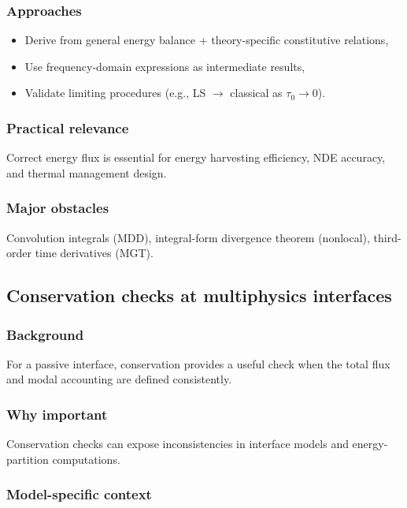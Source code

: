 \subsubsection{Approaches}

\begin{itemize}
\item Derive from general energy balance + theory-specific constitutive relations,
\item Use frequency-domain expressions as intermediate results,
\item Validate limiting procedures (e.g., LS $\to$ classical as $\tau_0 \to 0$).
\end{itemize}

\subsubsection{Practical relevance}

Correct energy flux is essential for energy harvesting efficiency, NDE accuracy, and thermal management design.

\subsubsection{Major obstacles}

Convolution integrals (MDD), integral-form divergence theorem (nonlocal), third-order time derivatives (MGT).

\subsection{Conservation checks at multiphysics interfaces}
\label{sec:15.2}

\subsubsection{Background}

For a passive interface, conservation provides a useful check when the total flux and modal accounting are defined consistently.

\subsubsection{Why important}

Conservation checks can expose inconsistencies in interface models and energy-partition computations.

\subsubsection{Model-specific context}


